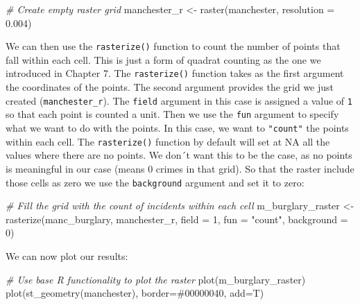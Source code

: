 \documentclass[
  krantz2]{krantz}
\makeatletter
\newenvironment{Shaded}{\begin{snugshade}}{\end{snugshade}}
\newcommand{\AttributeTok}[1]{\textcolor[rgb]{0.61,0.61,0.61}{#1}}
\newcommand{\CommentTok}[1]{\textcolor[rgb]{0.37,0.37,0.37}{\textit{#1}}}
\newcommand{\DecValTok}[1]{\textcolor[rgb]{0.06,0.06,0.06}{#1}}
\newcommand{\FloatTok}[1]{\textcolor[rgb]{0.06,0.06,0.06}{#1}}
\newcommand{\FunctionTok}[1]{\textcolor[rgb]{0,0,0}{#1}}
\newcommand{\NormalTok}[1]{#1}
\newcommand{\OtherTok}[1]{\textcolor[rgb]{0.37,0.37,0.37}{#1}}
\newcommand{\StringTok}[1]{\textcolor[rgb]{0.5,0.5,0.5}{#1}}
\newenvironment{kframe}{%
\medskip{}
\setlength{\fboxsep}{.8em}
 \def\at@end@of@kframe{}%
 \ifinner\ifhmode%
  \def\at@end@of@kframe{\end{minipage}}%
  \begin{minipage}{\columnwidth}%
 \fi\fi%
 \def\FrameCommand##1{\hskip\@totalleftmargin \hskip-\fboxsep
 \colorbox{shadecolor}{##1}\hskip-\fboxsep
     \hskip-\linewidth \hskip-\@totalleftmargin \hskip\columnwidth}%
 \MakeFramed {\advance\hsize-\width
   \@totalleftmargin\z@ \linewidth\hsize
   \@setminipage}}%
 {\par\unskip\endMakeFramed%
 \at@end@of@kframe}
\renewenvironment{Shaded}{\begin{kframe}}{\end{kframe}}
\makeatother
\begin{document}
\begin{Shaded}
\begin{Highlighting}[]
\CommentTok{\# Create empty raster grid}
\NormalTok{manchester\_r }\OtherTok{\textless{}{-}} \FunctionTok{raster}\NormalTok{(manchester, }\AttributeTok{resolution =} \FloatTok{0.004}\NormalTok{)}
\end{Highlighting}
\end{Shaded}

We can then use the \texttt{rasterize()} function to count the number of points that fall within each cell. This is just a form of quadrat counting as the one we introduced in Chapter 7. The \texttt{rasterize()} function takes as the first argument the coordinates of the points. The second argument provides the grid we just created (\texttt{manchester\_r}). The \texttt{field} argument in this case is assigned a value of \texttt{1} so that each point is counted a unit. Then we use the \texttt{fun} argument to specify what we want to do with the points. In this case, we want to \texttt{"count"} the points within each cell. The \texttt{rasterize()} function by default will set at NA all the values where there are no points. We don´t want this to be the case, as no points is meaningful in our case (means 0 crimes in that grid). So that the raster include those cells as zero we use the \texttt{background} argument and set it to zero:

\begin{Shaded}
\begin{Highlighting}[]
\CommentTok{\# Fill the grid with the count of incidents within each cell}
\NormalTok{m\_burglary\_raster }\OtherTok{\textless{}{-}} \FunctionTok{rasterize}\NormalTok{(manc\_burglary,}
\NormalTok{                                manchester\_r,}
                                \AttributeTok{field =} \DecValTok{1}\NormalTok{,}
                                \AttributeTok{fun =} \StringTok{"count"}\NormalTok{,}
                                \AttributeTok{background =} \DecValTok{0}\NormalTok{)}
\end{Highlighting}
\end{Shaded}

We can now plot our results:

\begin{Shaded}
\begin{Highlighting}[]
\CommentTok{\# Use base R functionality to plot the raster}
\FunctionTok{plot}\NormalTok{(m\_burglary\_raster)}
\FunctionTok{plot}\NormalTok{(}\FunctionTok{st\_geometry}\NormalTok{(manchester), }\AttributeTok{border=}\StringTok{\textquotesingle{}\#00000040\textquotesingle{}}\NormalTok{, }\AttributeTok{add=}\NormalTok{T)}
\end{Highlighting}
\end{Shaded}
\end{document}
